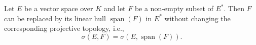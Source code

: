 Let $E$ be a vector space over $K$ and let $F$ be a non-empty subset of $E^*$. Then $F$ can be replaced by its linear hull $\operatorname{span}(F)$ in $E^*$ without changing the corresponding projective topology, i.e.,
$$\sigma(E, F) = \sigma(E, \operatorname{span}(F)).$$
